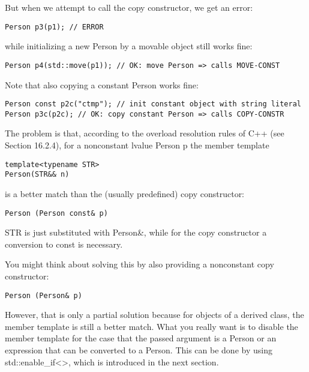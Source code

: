 But when we attempt to call the copy constructor, we get an error:

\begin{lstlisting}[style=styleCXX]
Person p3(p1); // ERROR
\end{lstlisting}

while initializing a new Person by a movable object still works fine:

\begin{lstlisting}[style=styleCXX]
Person p4(std::move(p1)); // OK: move Person => calls MOVE-CONST
\end{lstlisting}

Note that also copying a constant Person works fine:

\begin{lstlisting}[style=styleCXX]
Person const p2c("ctmp"); // init constant object with string literal
Person p3c(p2c); // OK: copy constant Person => calls COPY-CONSTR
\end{lstlisting}

The problem is that, according to the overload resolution rules of C++ (see Section 16.2.4), for a nonconstant lvalue Person p the member template

\begin{lstlisting}[style=styleCXX]
template<typename STR>
Person(STR&& n)
\end{lstlisting}

is a better match than the (usually predefined) copy constructor:

\begin{lstlisting}[style=styleCXX]
Person (Person const& p)
\end{lstlisting}

STR is just substituted with Person\&, while for the copy constructor a conversion to const is necessary.

You might think about solving this by also providing a nonconstant copy constructor:

\begin{lstlisting}[style=styleCXX]
Person (Person& p)
\end{lstlisting}

However, that is only a partial solution because for objects of a derived class, the member template is still a better match. What you really want is to disable the member template for the case that the passed argument is a Person or an expression that can be converted to a Person. This can be done by using std::enable\_if<>, which is introduced in the next section.
































